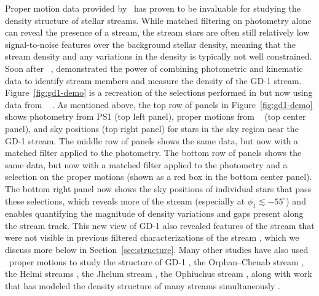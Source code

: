 \documentclass[final,5p,times,twocolumn,authoryear]{elsarticle}
\begin{document}
Proper motion data provided by \gaia\ has proven to be invaluable for studying the
density structure of stellar streams.
While matched filtering on photometry alone can reveal the presence of a stream, the
stream stars are often still relatively low signal-to-noise features over the background
stellar density, meaning that the stream density and any variations in the density is
typically not well constrained.
Soon after \gaia\ , \citet{price-whelan:2018} demonstrated the power of combining
photometric and kinematic data to identify stream members and measure the density of the
GD-1 stream.
Figure~\ref{fig:gd1-demo} is a recreation of the selections performed in
\citet{price-whelan:2018} but now using data from \gaia\  \citep{gaiadr3}.
As mentioned above, the top row of panels in Figure~\ref{fig:gd1-demo} shows photometry
from PS1 (top left panel), proper motions from \gaia\  (top center panel), and sky
positions (top right panel) for stars in the sky region near the GD-1 stream.
The middle row of panels shows the same data, but now with a matched filter applied to
the photometry.
The bottom row of panels shows the same data, but now with a matched filter applied to
the photometry and a selection on the proper motions (shown as a red box in the bottom
center panel).
The bottom right panel now shows the sky positions of individual stars that pass these
selections, which reveals more of the stream (especially at $\phi_1 \lesssim -55^\circ$)
and enables quantifying the magnitude of density variations and gaps present along the
stream track.
This new view of GD-1 also revealed features of the stream that were not visible in
previous filtered characterizations of the stream \citep{grillmair:2006-gd1,
koposov:2010, deboer:2018}, which we discuss more below in Section~\ref{sec:structure}.
Many other studies have also used \gaia\ proper motions to study the structure of GD-1
\citep[e.g.,][]{malhan:2018, li-yanny:2018, huang:2019, deboer:2020, ibata:2020}, the
Orphan--Chenab stream \citep{koposov:2019}, the Helmi streams \citep{koppelman:2019},
the Jhelum stream \citep{bonaca:2019}, the Ophiuchus stream \citep{caldwell:2020}, along
with work that has modeled the density structure of many streams simultaneously
\citep[e.g.,][]{patrick:2022}.
\end{document}
